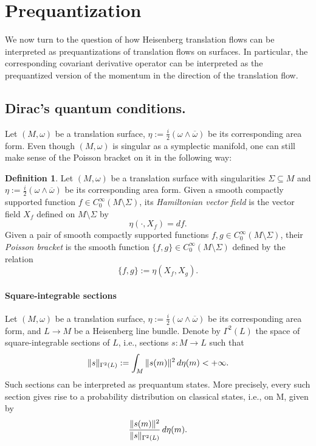 \documentclass{amsart}
\theoremstyle{definition}
\newtheorem{definition}[theorem]{Definition}
\theoremstyle{remark}
\numberwithin{equation}{section}
\newcommand{\<}{{\langle}}
\renewcommand{\>}{{\rangle}}
\begin{document}
\section{Prequantization}\label{sec:prequant}

We now turn to the question of how Heisenberg translation flows can be interpreted as prequantizations of translation flows on surfaces. In particular, the corresponding covariant derivative operator can be interpreted as the prequantized version of the momentum in the direction of the translation flow.

\subsection{Dirac's quantum conditions.}\label{sec:dirac} Let $(M,\omega)$ be a translation surface, $\eta:= \frac{i}{2}(\omega \wedge \overline{\omega})$ be its corresponding area form. Even though $(M,\omega)$ is singular as a symplectic manifold, one can still make sense of the Poisson bracket on it in the following way:

\begin{definition}
    \label{def:poisson}
    Let $(M,\omega)$ be a translation surface with singularities $\Sigma \subseteq M$ and $\eta:= \frac{i}{2}(\omega \wedge \overline{\omega})$ be its corresponding area form. Given a smooth compactly supported function $f \in C_0^\infty(M \setminus \Sigma)$, its \textit{Hamiltonian vector field} is the vector field $X_f$ defined on $M \setminus \Sigma$ by
    \[
    \eta(\cdot,X_f) = df.
    \]
    Given a pair of smooth compactly supported functions $f,g \in C_0^\infty(M \setminus \Sigma)$, their \textit{Poisson bracket} is the smooth function $\{f,g\} \in C_0^\infty(M \setminus \Sigma)$ defined by the relation
    \[
    \{f,g\} := \eta(X_f,X_g).
    \]
\end{definition}

\paragraph*{\bf Square-integrable sections} Let $(M,\omega)$ be a translation surface, $\eta:= \frac{i}{2}(\omega \wedge \overline{\omega})$ be its corresponding area form, and $L \to M$ be a Heisenberg line bundle. Denote by $\Gamma^2(L)$ the space of square-integrable sections of $L$, i.e., sections $s \colon M \to L$ such that
\[
\|s\|_{\Gamma^2(L)} :=\int_M \|s(m)\|^2 \thinspace d\eta(m) < +\infty.
\]
Such sections can be interpreted as prequantum states. More precisely, every such section gives rise to a probability distribution on classical states, i.e., on M, given by
\[
\frac{\|s(m)\|^2}{\|s\|_{\Gamma^2(L)}} \thinspace d\eta(m).
\]
\end{document}

